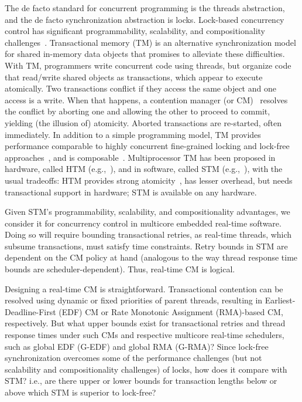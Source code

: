 \documentclass[letter]{sig-alternate}
\begin{document}
The de facto standard for concurrent programming is the threads abstraction, and the de facto synchronization abstraction is locks. 
Lock-based concurrency control has significant programmability, scalability, and compositionality challenges~\cite{Herlihy:2006:AMP:1146381.1146382}. Transactional memory (TM) is an alternative synchronization model for shared in-memory data objects that promises to alleviate these difficulties.  With TM, programmers write concurrent code using threads, but organize code that read/write shared objects as transactions, which appear to execute atomically. Two transactions conflict if they access the same object and one access is a write. When that happens, a contention manager (or CM)~\cite{Guerraoui:2005:TTT:1073814.1073863} resolves the conflict by aborting one and allowing the other to proceed to commit, yielding (the illusion of) atomicity. Aborted transactions are re-started, often immediately.  In addition to a simple programming model, TM provides performance comparable to highly concurrent fine-grained locking and lock-free approaches~\cite{Saha:2006:MHP:1122971.1123001}, and is composable~\cite{Harris:2005:CMT:1065944.1065952}. Multiprocessor TM has been proposed in hardware, called HTM (e.g.,~\cite{austenmc:tcc:dissertation:2009}), and in software, called STM (e.g.,~\cite{sha95}), with the usual tradeoffs: HTM provides strong atomicity~\cite{austenmc:tcc:dissertation:2009}, has lesser overhead, but needs transactional support in hardware; STM is available on any hardware.


Given STM's programmability, scalability, and compositionality advantages, we consider it for concurrency control in multicore embedded real-time software. Doing so will require bounding transactional  retries, as real-time threads, which subsume transactions, must satisfy time constraints.  Retry bounds in STM are dependent on the CM policy at hand (analogous to the way thread response time bounds are scheduler-dependent). Thus, real-time CM is logical.

Designing a real-time CM is straightforward. Transactional contention can be resolved using dynamic or fixed priorities of parent threads, resulting in Earliest-Deadline-First (EDF) CM or Rate Monotonic Assignment (RMA)-based CM, respectively. But what upper bounds exist for transactional retries and thread response times under such CMs and respective multicore real-time schedulers, such as global EDF (G-EDF) and global RMA (G-RMA)? Since lock-free synchronization overcomes some of the performance challenges (but not scalability and compositionality challenges) of locks, how does it compare with STM? i.e., are there upper or lower bounds for transaction lengths below or above which STM is superior to lock-free?
\end{document}
